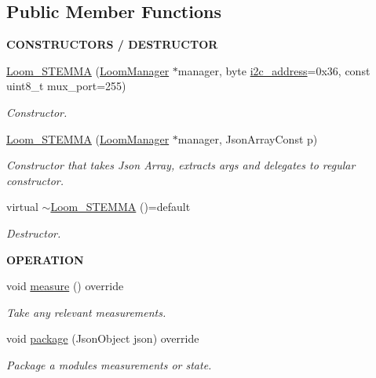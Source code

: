 \subsection*{Public Member Functions}
\begin{Indent}{\bf C\+O\+N\+S\+T\+R\+U\+C\+T\+O\+RS / D\+E\+S\+T\+R\+U\+C\+T\+OR}\par
\begin{DoxyCompactItemize}
\item 
\hyperlink{class_loom___s_t_e_m_m_a_a45c0901b1a9e848aa25452eb86335736}{Loom\+\_\+\+S\+T\+E\+M\+MA} (\hyperlink{class_loom_manager}{Loom\+Manager} $\ast$manager, byte \hyperlink{class_loom_i2_c_sensor_a6ff389c1f015152a9ebfccb037d3d90e}{i2c\+\_\+address}=0x36, const uint8\+\_\+t mux\+\_\+port=255)
\begin{DoxyCompactList}\small\item\em Constructor. \end{DoxyCompactList}\item 
\hyperlink{class_loom___s_t_e_m_m_a_a07576a4d5b9595e686a6f9a0809aa32c}{Loom\+\_\+\+S\+T\+E\+M\+MA} (\hyperlink{class_loom_manager}{Loom\+Manager} $\ast$manager, Json\+Array\+Const p)
\begin{DoxyCompactList}\small\item\em Constructor that takes Json Array, extracts args and delegates to regular constructor. \end{DoxyCompactList}\item 
virtual \hyperlink{class_loom___s_t_e_m_m_a_a1d08b21fb63b8cf734a5a7461e1fd636}{$\sim$\+Loom\+\_\+\+S\+T\+E\+M\+MA} ()=default
\begin{DoxyCompactList}\small\item\em Destructor. \end{DoxyCompactList}\end{DoxyCompactItemize}
\end{Indent}
\begin{Indent}{\bf O\+P\+E\+R\+A\+T\+I\+ON}\par
\begin{DoxyCompactItemize}
\item 
void \hyperlink{class_loom___s_t_e_m_m_a_abdee7585790a9d6d7dcae5abf41448de}{measure} () override
\begin{DoxyCompactList}\small\item\em Take any relevant measurements. \end{DoxyCompactList}\item 
void \hyperlink{class_loom___s_t_e_m_m_a_aaee00fa7deb976da153cd6a90c62eceb}{package} (Json\+Object json) override
\begin{DoxyCompactList}\small\item\em Package a modules measurements or state. \end{DoxyCompactList}\end{DoxyCompactItemize}
\end{Indent}
